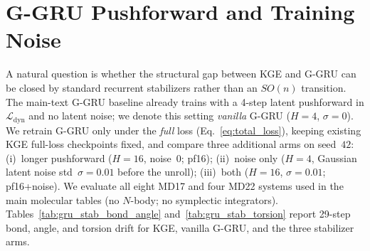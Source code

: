 \documentclass{article}
\newcommand{\GKE}{\textsc{KGE}}
\newcommand{\GGRU}{\textsc{G-GRU}}
\begin{document}
\section{G-GRU Pushforward and Training Noise}
\label{app:gru_stabilizers}

A natural question is whether the structural gap between \GKE{} and \GGRU{} can be closed by standard recurrent stabilizers rather than an $SO(n)$ transition.
The main-text \GGRU{} baseline already trains with a 4-step latent pushforward in $\mathcal{L}_{\text{dyn}}$ and no latent noise; we denote this setting \emph{vanilla} \GGRU{} ($H{=}4$, $\sigma{=}0$).
We retrain \GGRU{} only under the \emph{full} loss (Eq.~\eqref{eq:total_loss}), keeping existing \GKE{} full-loss checkpoints fixed, and compare three additional arms on seed~$42$:
(i)~longer pushforward ($H{=}16$, noise~$0$; pf16);
(ii)~noise only ($H{=}4$, Gaussian latent noise std~$\sigma{=}0.01$ before the unroll);
(iii)~both ($H{=}16$, $\sigma{=}0.01$; pf16+noise).
We evaluate all eight MD17 and four MD22 systems used in the main molecular tables (no $N$-body; no symplectic integrators).
Tables~\ref{tab:gru_stab_bond_angle} and~\ref{tab:gru_stab_torsion} report 29-step bond, angle, and torsion drift for \GKE{}, vanilla \GGRU{}, and the three stabilizer arms.
\end{document}
